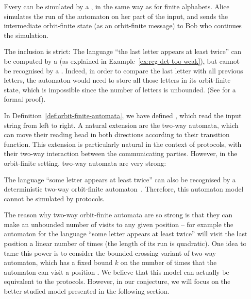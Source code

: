 \begin{myexample} \label{ex:protocol-not-dofa}
  Every  can be simulated by a 
  , in the same way as for finite alphabets.
  Alice simulates the run of the automaton on her part of the input, 
  and sends the intermediate orbit-finite state (as an orbit-finite message)
  to Bob who continues the simulation.  
  
  The inclusion is strict: The language ``the last letter appears at least
  twice'' can be computed by a  (as explained in
  Example~\ref{ex:reg-det-too-weak}), but cannot be recognised by a 
  . Indeed, in order to compare the
  last letter with all previous letters, the automaton would need to store all
  those letters in its orbit-finite state, which is impossible since the number of letters 
  is unbounded. (See \cite[Example~4]{kaminskiFiniteMemoryAutomata1994} for a formal proof).
\end{myexample}

In Definition~\ref{def:orbit-finite-automata}, we have defined , which read the input string from left to right. A
natural extension are the two-way automata, which can move their reading head
in both directions according to their transition function. This extension is
particularly natural in the context of protocols, with their two-way
interaction between the communicating parties. However, in the orbit-finite
setting, two-way automata are very strong:

\begin{myexample}\label{ex:protocol-not-2dofa}
    The language ``some letter appears at least twice'' can also be recognised
    by a deterministic two-way orbit-finite automaton~\cite[Example
    18]{bojanczyk_slightly}. Therefore, this automaton model cannot be
    simulated by protocols.

    The reason why two-way orbit-finite automata are so strong is that they can
    make an unbounded number of visits to any given position -- for example the
    automaton for the language ``some letter appears at least twice'' will
    visit the last position a linear number of times (the length of its run is
    quadratic). One idea to tame this power is to consider the bounded-crossing
    variant of two-way automaton, which has a fixed bound $k$ on the number of
    times that the automaton can visit a position \cite[p.~92]{neven2003power}.
    We believe that this model can actually be equivalent to the protocols.
    However, in our conjecture, we will focus on the better studied model
    presented in the following section.
\end{myexample}

